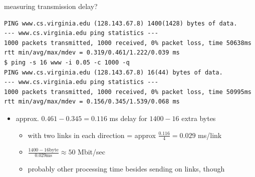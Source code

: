 \begin{frame}[fragile]{measuring transmission delay?}
\begin{Verbatim}[fontsize=\fontsize{10}{11}]
PING www.cs.virginia.edu (128.143.67.8) 1400(1428) bytes of data.
--- www.cs.virginia.edu ping statistics ---
1000 packets transmitted, 1000 received, 0% packet loss, time 50638ms
rtt min/avg/max/mdev = 0.319/0.461/1.222/0.039 ms
$ ping -s 16 www -i 0.05 -c 1000 -q
PING www.cs.virginia.edu (128.143.67.8) 16(44) bytes of data.
--- www.cs.virginia.edu ping statistics ---
1000 packets transmitted, 1000 received, 0% packet loss, time 50995ms
rtt min/avg/max/mdev = 0.156/0.345/1.539/0.068 ms
\end{Verbatim}
\begin{itemize}
\item approx. $0.461 - 0.345 = 0.116$ ms delay for $1400-16$ extra bytes
    \begin{itemize}
    \item with two links in each direction = approx $\frac{0.116}{4}=0.029$ ms/link
    \item $\frac{1400-16 \text{byte}}{0.029 \text{ms}} \approx 50$ Mbit/sec
    \item probably other processing time besides sending on links, though
    \end{itemize}
\end{itemize}
\end{frame}
